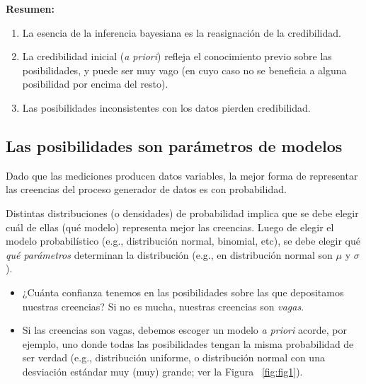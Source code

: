 \documentclass{scrartcl}
\begin{document}
	\textbf{\textsf{Resumen:}}
	\begin{enumerate}
		\item La esencia de la inferencia bayesiana es la reasignación de la credibilidad.
		\item La credibilidad inicial (\textit{a priori}) refleja el conocimiento previo sobre las posibilidades, y puede ser muy vago (en cuyo caso no se beneficia a alguna posibilidad por encima del resto).
		\item Las posibilidades inconsistentes con los datos pierden credibilidad.
	\end{enumerate}

	\subsection{Las posibilidades son parámetros de modelos}
	
	Dado que las mediciones producen datos variables, la mejor forma de representar las creencias del proceso generador de datos es con probabilidad. 
	
	Distintas distribuciones (o densidades) de probabilidad implica que se debe elegir cuál de ellas (qué modelo) representa mejor las creencias. Luego de elegir el modelo probabilístico (e.g., distribución normal, binomial, etc), se debe elegir qué \textit{qué parámetros} determinan la distribución (e.g., en distribución normal son $\mu$ y $\sigma$). 
	\begin{itemize}
		\item ¿Cuánta confianza tenemos en las posibilidades sobre las que depositamos nuestras creencias? Si no es mucha, nuestras creencias son \textit{vagas}.
		\item Si las creencias son vagas, debemos escoger un modelo \textit{a priori} acorde, por ejemplo, uno donde todas las posibilidades tengan la misma probabilidad de ser verdad (e.g., distribución uniforme, o distribución normal con una desviación estándar muy (muy) grande; ver la Figura ~\ref{fig:fig1}).
	\end{itemize}
		
\end{document}
